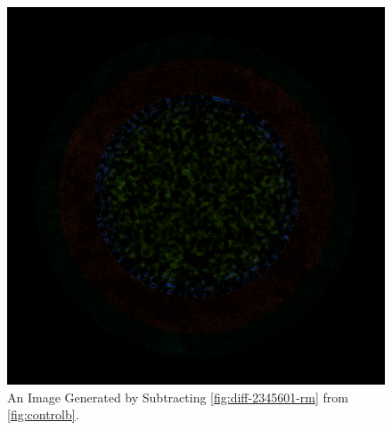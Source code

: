\begin{figure}[H]
\centering
\includegraphics[width=0.6\linewidth]{figures/shuffle/diff-2345601}
\caption{An Image Generated by Subtracting \ref{fig:diff-2345601-rm} from \ref{fig:controlb}.}
\label{fig:diff-2345601}
\end{figure}
